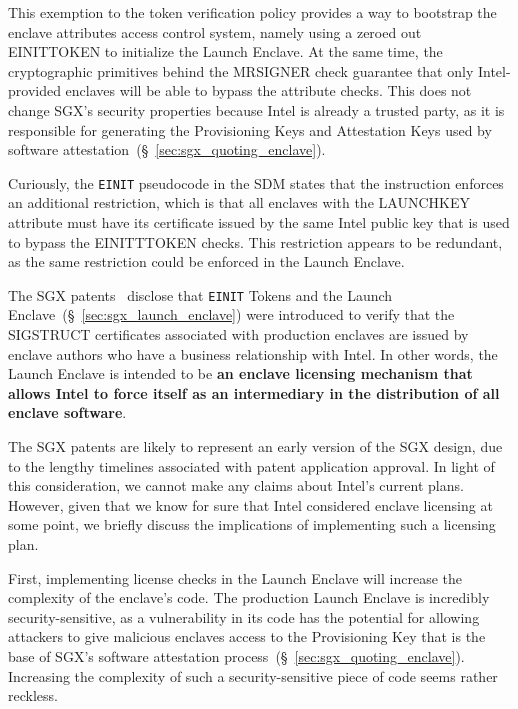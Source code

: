 This exemption to the token verification policy provides a way to bootstrap the
enclave attributes access control system, namely using a zeroed out EINITTOKEN
to initialize the Launch Enclave. At the same time, the cryptographic
primitives behind the MRSIGNER check guarantee that only Intel-provided
enclaves will be able to bypass the attribute checks. This does not change
SGX's security properties because Intel is already a trusted party, as it is
responsible for generating the Provisioning Keys and Attestation Keys used by
software attestation~(\S~\ref{sec:sgx_quoting_enclave}).

Curiously, the \texttt{EINIT} pseudocode in the SDM states that the instruction
enforces an additional restriction, which is that all enclaves with the
LAUNCHKEY attribute must have its certificate issued by the same Intel public
key that is used to bypass the EINITTTOKEN checks. This restriction appears to
be redundant, as the same restriction could be enforced in the Launch Enclave.


\label{sec:sgx_licensing}

The SGX patents~\cite{intel2013patent1, intel2013patent2} disclose that
\texttt{EINIT} Tokens and the Launch Enclave~(\S~\ref{sec:sgx_launch_enclave})
were introduced to verify that the SIGSTRUCT certificates associated with
production enclaves are issued by enclave authors who have a business
relationship with Intel. In other words, the Launch Enclave is intended to be
\textbf{an enclave licensing mechanism that allows Intel to force itself as an
intermediary in the distribution of all enclave software}.

The SGX patents are likely to represent an early version of the SGX design, due
to the lengthy timelines associated with patent application approval.
In light of this consideration, we cannot make any claims about Intel's current
plans. However, given that we know for sure that Intel considered enclave
licensing at some point, we briefly discuss the implications of implementing
such a licensing plan.

First, implementing license checks in the Launch Enclave will increase the
complexity of the enclave's code. The production Launch Enclave is incredibly
security-sensitive, as a vulnerability in its code has the potential for
allowing attackers to give malicious enclaves access to the Provisioning Key
that is the base of SGX's software attestation
process~(\S~\ref{sec:sgx_quoting_enclave}). Increasing the complexity of such a
security-sensitive piece of code seems rather reckless.


